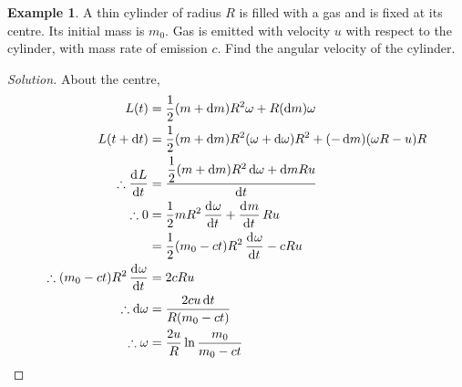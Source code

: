 \documentclass[fleqn, a4paper, 12pt]{article}
\theoremstyle{definition}
\newtheorem{example}{Example}
\theoremstyle{theorem}
\newenvironment{solution}
{\begin{proof}[Solution]\let\qed\relax}
	{\end{proof}}
\begin{document}
\begin{example}
	A thin cylinder of radius $R$ is filled with a gas and is fixed at its centre. Its initial mass is $m_0$. Gas is emitted with velocity $u$ with respect to the cylinder, with mass rate of emission $c$. Find the angular velocity of the cylinder.
\end{example}

\begin{solution}
	About the centre,
	\begin{align*}
		L(t) &= \dfrac{1}{2} (m + \dif m) R^2 \omega + R (\dif m) \omega\\
		L(t + \dif t) &= \dfrac{1}{2} (m + \dif m) R^2 (\omega + \dif \omega) R^2 + (-\dif m) (\omega R - u) R\\
		\therefore \dod{L}{t} &= \dfrac{\dfrac{1}{2} (m + \dif m) R^2 \dif \omega + \dif m R u}{\dif t}\\
		\therefore 0 &= \dfrac{1}{2} m R^2 \dod{\omega}{t} + \dod{m}{t} R u\\
		&= \dfrac{1}{2} (m_0 - c t) R^2 \dod{\omega}{t} - c R u\\
		\therefore (m_0 - c t) R^2 \dod{\omega}{t} &= 2 c R u\\
		\therefore \dif \omega &= \dfrac{2 c u \dif t}{R (m_0 - c t)}\\
		\therefore \omega &= \dfrac{2 u}{R} \ln \dfrac{m_0}{m_0 - c t}
	\end{align*}
\end{solution}
\end{document}
